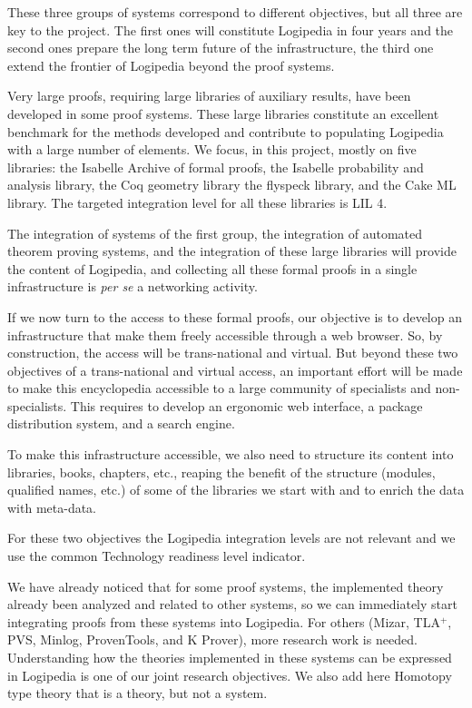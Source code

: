 These three groups of systems correspond to different
objectives, but all three are key to the project. The first ones will
constitute Logipedia in four years and the second ones prepare the
long term future of the infrastructure, the third one extend the
frontier of Logipedia beyond the proof systems.

Very large proofs, requiring large libraries of auxiliary results,
have been developed in some proof systems. These large libraries
constitute an excellent benchmark for the methods developed and
contribute to populating Logipedia with a large number of elements.
We focus, in this project, mostly on five libraries: the Isabelle
Archive of formal proofs, the Isabelle probability and analysis
library, the Coq geometry library the flyspeck library, and the Cake
ML library.  The targeted integration level for all these libraries is
LIL 4.

The integration of systems of the first group, the integration of
automated theorem proving systems, and the integration of these large
libraries will provide the content of Logipedia, and collecting all
these formal proofs in a single infrastructure is {\em per se} a
networking activity.

If we now turn to the access to these formal proofs, our objective is
to develop an infrastructure that make them freely accessible through
a web browser. So, by construction, the access will be trans-national
and virtual. But beyond these two objectives of a trans-national and
virtual access, an important effort will be made to make this
encyclopedia accessible to a large community of specialists and
non-specialists.  This requires to develop an ergonomic web interface,
a package distribution system, and a search engine.

To make this infrastructure accessible, we also need to structure its
content into libraries, books, chapters, etc., reaping the benefit of
the structure (modules, qualified names, etc.) of some of the
libraries we start with and to enrich the data with meta-data.

For these two objectives the Logipedia integration levels are not
relevant and we use the common Technology readiness level indicator.

We have already noticed that for some proof systems, the implemented
theory already been analyzed and related to other systems, so we can
immediately start integrating proofs from these systems into
Logipedia. For others (Mizar, TLA$^+$, PVS, Minlog, ProvenTools, and
K Prover), more research work is needed. Understanding how the
theories implemented in these systems can be expressed in Logipedia is
one of our joint research objectives.  We also add here Homotopy type
theory that is a theory, but not a system.

